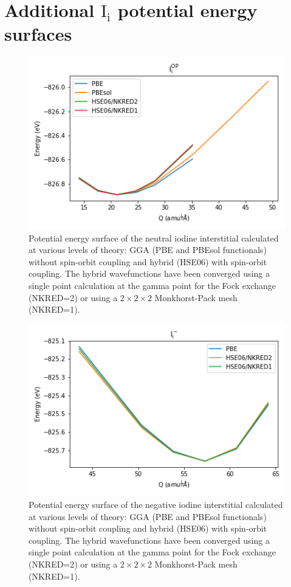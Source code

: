 \chapter{\label{app:9-configcoord}Additional $\mathrm{I}_\mathrm{i}$ potential energy surfaces}

\begin{figure}[h!]   %
\centering
  \includegraphics[width=0.7\columnwidth]{figures/ch6/neutral_comparison.png}
  \caption[Potential energy surface of the neutral iodine interstitial calculated at various levels of theory]{Potential energy surface of the neutral iodine interstitial calculated at various levels of theory: GGA (PBE and PBEsol functionals) without spin-orbit coupling and hybrid (HSE06) with spin-orbit coupling. The hybrid wavefunctions have been converged using a single point calculation at the gamma point for the Fock exchange (NKRED=2) or using a $2\!\times\!2\!\times\!2$ Monkhorst-Pack mesh (NKRED=1).}
\end{figure}

\begin{figure}[h!]   %
\centering
  \includegraphics[width=0.7\columnwidth]{figures/ch6/negative_comparison.png}
  \caption[Potential energy surface of the negative iodine interstitial calculated at various levels of theory]{Potential energy surface of the negative iodine interstitial calculated at various levels of theory: GGA (PBE and PBEsol functionals) without spin-orbit coupling and hybrid (HSE06) with spin-orbit coupling. The hybrid wavefunctions have been converged using a single point calculation at the gamma point for the Fock exchange (NKRED=2) or using a $2\!\times\!2\!\times\!2$ Monkhorst-Pack mesh (NKRED=1).}
\end{figure}


